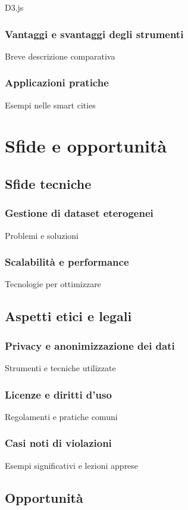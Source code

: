 D3.js

\subsubsection{Vantaggi e svantaggi degli strumenti}
Breve descrizione comparativa

\subsubsection{Applicazioni pratiche}
Esempi nelle smart cities


\section{Sfide e opportunità}   %
\subsection{Sfide tecniche}
\subsubsection{Gestione di dataset eterogenei}
Problemi e soluzioni

\subsubsection{Scalabilità e performance}
Tecnologie per ottimizzare

\subsection{Aspetti etici e legali}
\subsubsection{Privacy e anonimizzazione dei dati}
Strumenti e tecniche utilizzate

\subsubsection{Licenze e diritti d'uso}
Regolamenti e pratiche comuni

\subsubsection{Casi noti di violazioni}
Esempi significativi e lezioni apprese

\subsection{Opportunità}
